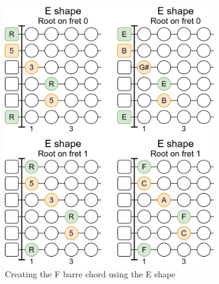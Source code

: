 \begin{figure}[h]
	\centering
	\begin{subfigure}{0.37\textwidth}
		\includegraphics[width=\textwidth]{../../Images/CagedEShapeToFChord.png}
		\caption{Creating the F barre chord using the E shape}
		\label{fig:guitar_caged_e_shape_to_f}
	\end{subfigure}
	\hfill
	\begin{subfigure}{0.37\textwidth}

\end{subfigure}
\end{figure}
